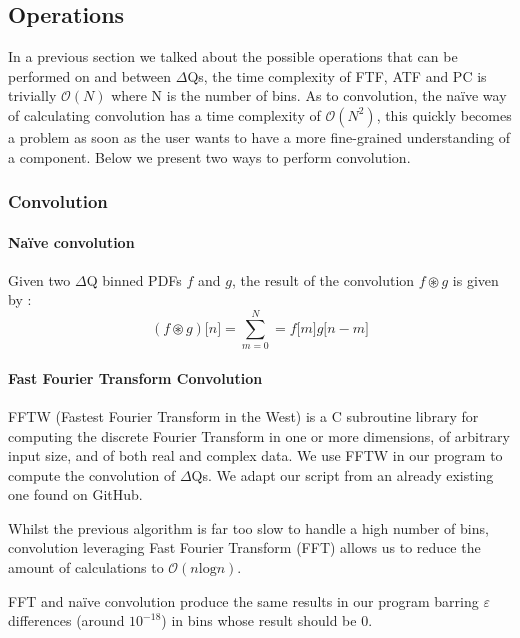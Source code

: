       \subsection{Operations}
    In a previous section we talked about the possible operations that can be performed on and between $\Delta$Qs, the time complexity of FTF, ATF and PC is trivially $\mathcal{O}(N)$ where N is the number of bins. As to convolution, the naïve way of calculating convolution has a time complexity of $\mathcal{O}(N^2)$, this quickly becomes a problem as soon as the user wants to have a more fine-grained understanding of a component. Below we present two ways to perform convolution.

        \subsubsection{Convolution}
        
        \paragraph{Naïve convolution}
        Given two $\Delta$Q binned PDFs $f$ and $g$, the result of the convolution $f \circledast g$ is given by \cite{conv}: 
        \begin{equation}
            (f \circledast g)\lbrack n \rbrack = \sum_{m = 0}^{N} = f\lbrack m \rbrack g \lbrack n - m \rbrack  
            \label{eq:discconv}
        \end{equation}
 
    \paragraph{Fast Fourier Transform Convolution}
        FFTW (Fastest Fourier Transform in the West) is a C subroutine library \cite{fftw3} for computing the discrete Fourier Transform in one or more dimensions, of arbitrary input size, and of both real and complex data. We use FFTW in our program to compute the convolution of $\Delta$Qs. We adapt our script from an already existing one found on GitHub. \cite{fft}
    
    Whilst the previous algorithm is far too slow to handle a high number of bins, convolution leveraging Fast Fourier Transform (FFT) allows us to reduce the amount of calculations to $\mathcal{O}(n \text{log} n)$. 
    
    FFT and naïve convolution produce the same results in our program barring $\varepsilon$ differences (around $10^{-18}$) in bins whose result should be 0.
    
